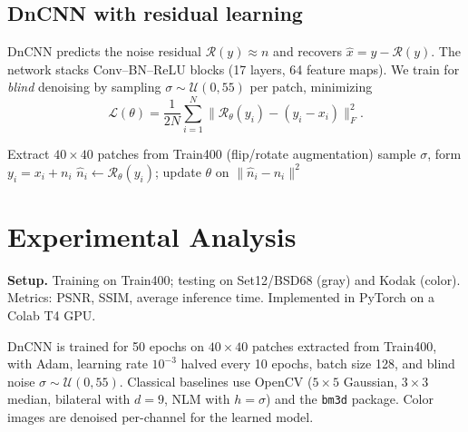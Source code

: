 \documentclass[conference]{IEEEtran}
\begin{document}
\subsection{DnCNN with residual learning}
DnCNN predicts the noise residual $\mathcal{R}(y)\approx n$ and recovers
$\hat{x} = y - \mathcal{R}(y)$. The network stacks Conv--BN--ReLU blocks
(17 layers, 64 feature maps). We train for \emph{blind} denoising by sampling
$\sigma \sim \mathcal{U}(0,55)$ per patch, minimizing
\begin{equation}
\mathcal{L}(\theta) = \frac{1}{2N}\sum_{i=1}^{N}\lVert \mathcal{R}_\theta(y_i) - (y_i - x_i)\rVert_F^2 .
\end{equation}

\begin{algorithmic}[1]
\STATE Extract $40\times40$ patches from Train400 (flip/rotate augmentation)
    \STATE sample $\sigma$, form $y_i = x_i + n_i$
    \STATE $\hat{n}_i \leftarrow \mathcal{R}_\theta(y_i)$;\; update $\theta$ on $\lVert \hat{n}_i-n_i\rVert^2$
  \ENDFOR
\ENDFOR
\end{algorithmic}


\section{Experimental Analysis}\label{sec:exp}
\textbf{Setup.} Training on Train400; testing on Set12/BSD68 (gray) and Kodak
(color). Metrics: PSNR, SSIM, average inference time. Implemented in PyTorch on a
Colab T4 GPU.

DnCNN is trained for 50 epochs on $40\times40$ patches extracted from Train400,
with Adam, learning rate $10^{-3}$ halved every 10 epochs, batch size 128, and
blind noise $\sigma\sim\mathcal{U}(0,55)$. Classical baselines use OpenCV
($5\times5$ Gaussian, $3\times3$ median, bilateral with $d{=}9$, NLM with
$h{=}\sigma$) and the \texttt{bm3d} package. Color images are denoised
per-channel for the learned model.
\end{document}
